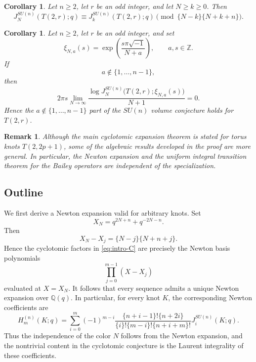 \documentclass[11pt]{amsart}
\newtheorem{corollary}[theorem]{Corollary}
\newtheorem{remark}[theorem]{Remark}
\begin{document}
\begin{corollary}\label{cor:intro-congruence}
Let \(n\geq2\), let \(r\) be an odd integer, and let \(N\geq k\geq0\).
Then
\[
J_N^{SU(n)}(T(2,r);q)
\equiv
J_k^{SU(n)}(T(2,r);q)
\pmod{\{N-k\}\{N+k+n\}}.
\]
\end{corollary}

\begin{corollary}\label{cor:intro-volume}
Let \(n\geq2\), let \(r\) be an odd integer, and set
\[
\xi_{N,a}(s)
=
\exp\left(
\frac{s\pi\sqrt{-1}}{N+a}
\right),
\qquad a,s\in\mathbb Z.
\]
If
\[
a\notin\{1,\ldots,n-1\},
\]
then
\[
2\pi s
\lim_{N\to\infty}
\frac{
\log
J_N^{SU(n)}
\bigl(T(2,r);\xi_{N,a}(s)\bigr)
}{
N+1
}
=
0.
\]
Hence the \(a\notin\{1,\ldots,n-1\}\) part of the \(SU(n)\) volume conjecture holds for $T(2,r)$.
\end{corollary}

\begin{remark}
    Although the main cyclotomic expansion theorem is stated for
torus knots \(T(2,2p+1)\), some of the algebraic results developed in the
proof are more general.  In particular, the Newton expansion and the
uniform integral transition theorem for the Bailey operators are
independent of the specialization.
\end{remark}
\subsection{Outline}

We first derive a Newton expansion valid for arbitrary knots. Set
\[
X_N=q^{2N+n}+q^{-2N-n}.
\]
Then
\[
X_N-X_j=\{N-j\}\{N+n+j\}.
\]
Hence the cyclotomic factors in \eqref{eq:intro-C} are precisely the
Newton basis polynomials
\[
\prod_{j=0}^{m-1}(X-X_j)
\]
evaluated at \(X=X_N\).  It follows that every sequence admits a unique
Newton expansion over \(\mathbb Q(q)\).  In particular, for every knot
\(K\), the corresponding Newton coefficients are
\begin{equation}\label{eq:intro-universal-H}
H_m^{(n)}(K;q)
=
\sum_{i=0}^{m}
(-1)^{m-i}
\frac{
\{n+i-1\}!\{n+2i\}
}{
\{i\}!\{m-i\}!\{n+i+m\}!
}
J_i^{SU(n)}(K;q).
\end{equation}
Thus the independence of the color \(N\) follows from the Newton
expansion, and the nontrivial content in the cyclotomic conjecture is
the Laurent integrality of these coefficients.
\end{document}

